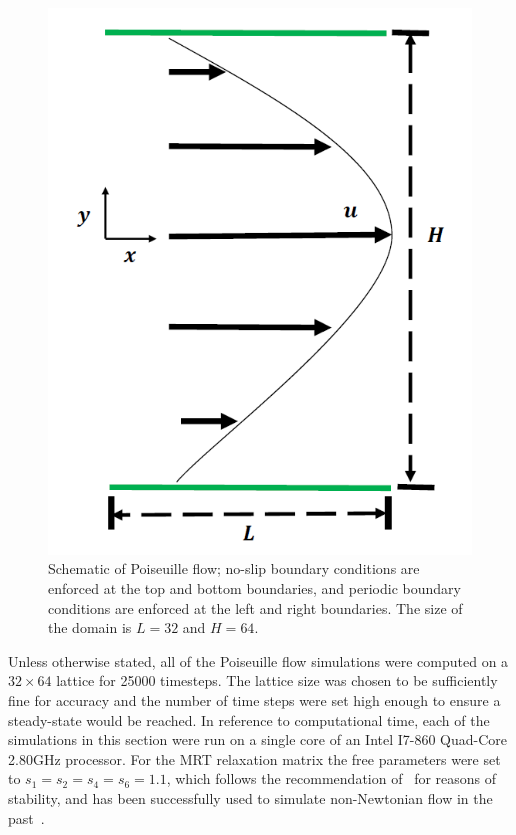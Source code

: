 \begin{figure}
	\centering
    \includegraphics[width=\linewidth]{figs/poise-schematic}
    \caption{Schematic of Poiseuille flow; no-slip boundary conditions are enforced at the top and bottom boundaries, and periodic boundary conditions are enforced at the left and right boundaries.
The size of the domain is $L = 32$  and $H = 64$.}
    \label{fig:poise-schematic}
\end{figure}

Unless otherwise stated, all of the Poiseuille flow simulations were computed on a $32 \times 64$ lattice for 25000 timesteps.
The lattice size was chosen to be sufficiently fine for accuracy and the number of time steps were set high enough to ensure a steady-state would be reached.
In reference to computational time, each of the simulations in this section were run on a single core of an Intel I7-860 Quad-Core 2.80GHz processor.
For the MRT relaxation matrix the free parameters were set to $s_1 = s_2 = s_4 = s_6 = 1.1$, which follows the recommendation of~\cite{lallemand2000theory} for reasons of stability, and has been successfully used to simulate non-Newtonian flow in the past~\cite{fallah2012multiple,grasinger2015simulation}.

